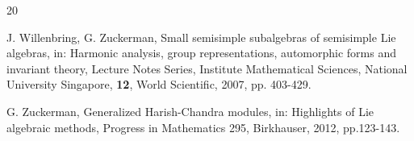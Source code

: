 \documentclass[10pt]{amsart}
\begin{document}
\begin{thebibliography}{20}
\vspace{.25cm}

 J. Willenbring, G. Zuckerman, Small semisimple subalgebras of semisimple Lie algebras, in: Harmonic analysis, group representations, automorphic forms and invariant theory, Lecture Notes Series, Institute Mathematical Sciences, National University Singapore, \textbf{12}, World Scientific, 2007, pp. 403-429. 

\vspace{.25cm}

 G. Zuckerman, Generalized Harish-Chandra modules, in: Highlights of Lie algebraic methods, Progress in Mathematics 295, Birkhauser, 2012, pp.123-143.  
\end{thebibliography}
\end{document}

